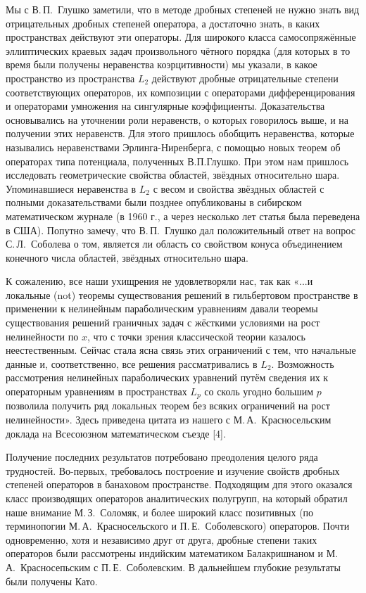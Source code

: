 Мы с В.\,П.~Глушко заметили, что в методе дробных степеней не нужно знать вид отрицательных дробных степеней оператора,
а достаточно знать, в каких пространствах действуют эти операторы.
Для широкого класса самосопряжённые эллиптических краевых задач произвольного чётного порядка
(для которых в то время были получены неравенства коэрцитивности) мы указали, в какое пространство из пространства $L_2$
действуют дробные отрицательные степени соответствующих операторов,
их композиции с операторами дифференцирования и операторами умножения на сингулярные коэффициенты.
Доказательства основывались на уточнении роли неравенств, о которых говорилось выше, и на получении этих неравенств.
Для этого пришлось обобщить неравенства, которые назывались неравенствами Эрлинга-Ниренберга,
с помощью новых теорем об операторах типа потенциала, полученных В.П.Глушко.
При этом нам пришлось исследовать геометрические свойства областей, звёздных относительно шара.
Упоминавшиеся неравенства в $L_2$
с весом и свойства звёздных областей с полными доказательствами были позднее опубликованы
в сибирском математическом журнале (в 1960 г., а через несколько лет статья была переведена в США).
Попутно замечу, что В.\,П.~Глушко дал положительный ответ на вопрос С.\,Л.~Соболева о том, является ли область со свойством конуса объединением конечного числа областей, звёздных относительно шара.

К сожалению, все наши ухищрения не удовлетворяли нас,
так как «...и локальные (not) теоремы существования решений в гильбертовом пространстве
в применении к нелинейным параболическим уравнениям давали теоремы существования решений граничных задач
с жёсткими условиями на рост нелинейности по $x$,
что с точки зрения классической теории казалось неестественным.
Сейчас стала ясна связь этих ограничений с тем, что начальные данные и, соответственно,
все решения рассматривались в $L_2$.
Возможность рассмотрения нелинейных параболических уравнений путём сведения их к операторным уравнениям в пространствах $L_p$
со сколь угодно большим $p$ позволила получить ряд локальных теорем без всяких ограничений на рост нелинейности».
Здесь приведена цитата из нашего с М.\,А.~Красносельским доклада на Всесоюзном математическом съезде [4].

Получение последних результатов потребовано преодоления целого ряда трудностей.
Во-первых, требовалось построение и изучение свойств дробных степеней операторов в банаховом пространстве.
Подходящим дпя этого оказался класс производящих операторов аналитических полугрупп,
на который обратил наше внимание М.\,З.~Соломяк, и более широкий класс позитивных
(по терминопогии М.\,А.~Красносельского и П.\,Е.~Соболевского) операторов. Почти одновременно, хотя и независимо друг от друга, дробные степени таких операторов были рассмотрены индийским математиком Балакришнаном и М.\,А.~Красносепьским с П.\,Е.~Соболевским. В дальнейшем глубокие результаты были получены Като.

